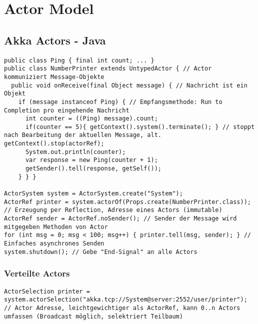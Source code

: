 \section{Actor Model}

\subsection{Akka Actors - Java}

\begin{lstlisting}
public class Ping { final int count; ... }
public class NumberPrinter extends UntypedActor { // Actor kommuniziert Message-Objekte
  public void onReceive(final Object message) { // Nachricht ist ein Objekt
  	if (message instanceof Ping) { // Empfangsmethode: Run to Completion pro eingehende Nachricht
  	  int counter = ((Ping) message).count;
  	  if(counter == 5){ getContext().system().terminate(); } // stoppt nach Bearbeitung der aktuellen Message, alt. getContext().stop(actorRef);
      System.out.println(counter);
      var response = new Ping(counter + 1);
      getSender().tell(response, getSelf());
    } } }

ActorSystem system = ActorSystem.create("System");
ActorRef printer = system.actorOf(Props.create(NumberPrinter.class)); // Erzeugung per Reflection, Adresse eines Actors (immutable)
ActorRef sender = ActorRef.noSender(); // Sender der Message wird mitgegeben Methoden von Actor
for (int msg = 0; msg < 100; msg++) { printer.tell(msg, sender); } // Einfaches asynchrones Senden
system.shutdown(); // Gebe "End-Signal" an alle Actors
\end{lstlisting}

\subsubsection{Verteilte Actors}

\begin{lstlisting}
ActorSelection printer = system.actorSelection("akka.tcp://System@server:2552/user/printer"); // Actor Adresse, leichtgewichtiger als ActorRef, kann 0..n Actors umfassen (Broadcast möglich, selektriert Teilbaum)
\end{lstlisting}
